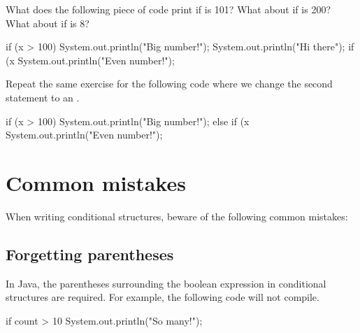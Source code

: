 \begin{exercise}
What does the following piece of code print if  is 101? What about if  is 200? What about if  is 8?


\begin{code}
if (x > 100) 
{
    System.out.println("Big number!");
} 
System.out.println("Hi there");
if (x %
{
    System.out.println("Even number!");
}

\end{code}

Repeat the same exercise for the following code where we change the second  statement to an .

\begin{code}
if (x > 100) 
{
    System.out.println("Big number!");
} 
else if (x %
{
    System.out.println("Even number!");
}

\end{code}



\end{exercise}






\section{Common mistakes}
When writing conditional structures, beware of the following common  mistakes:

\subsection{Forgetting parentheses}
In Java, the parentheses surrounding the boolean expression in conditional structures are required. For example, the following code will not compile.
\begin{code}
if count > 10
{
    System.out.println("So many!");
}
\end{code}

